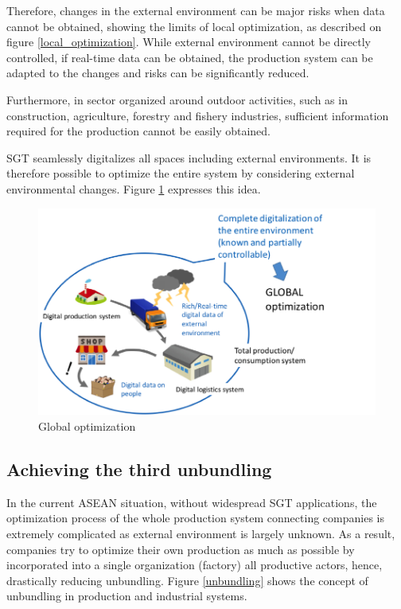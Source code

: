 Therefore, changes in the external environment can be major risks when data cannot be obtained, showing the limits of local optimization, as described on figure \ref{local_optimization}. While external environment cannot be directly controlled, if real-time data can be obtained, the production system can be adapted to the changes and risks can be significantly reduced.

Furthermore, in sector organized around outdoor activities, such as in construction, agriculture, forestry and fishery industries, sufficient information required for the production cannot be easily obtained. 

\vspace{0.4 cm}

SGT seamlessly digitalizes all spaces including external environments. It is therefore possible to optimize the entire system by considering external environmental changes. Figure \ref{global_optimization} expresses this idea.

\begin{figure}[H]
\begin{center}
\includegraphics[width = 0.8\linewidth]{Figures/global_optimization.png}
\end{center}
\caption{Global optimization}
\label{global_optimization}
\end{figure}


\subsection{Achieving the third unbundling} \label{unbundling_p}

\tab In the current ASEAN situation, without widespread SGT applications, the optimization process of the whole production system connecting companies is extremely complicated as external environment is largely unknown. As a result, companies try to optimize their own production as much as possible by incorporated into a single organization (factory) all productive actors, hence, drastically reducing unbundling. Figure \ref{unbundling} shows the concept of unbundling in production and industrial systems.

